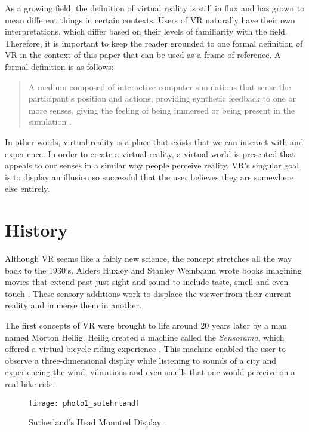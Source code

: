 As a growing field, the definition of virtual reality is still in flux and has grown to mean different things in certain contexts. Users of VR naturally have their own interpretations, which differ based on their levels of familiarity with the field.  Therefore, it is important to keep the reader grounded to one formal definition of VR in the context of this paper that can be used as a frame of reference. A formal definition is as follows:


\begin{quote}
	A medium composed of interactive computer simulations that sense the participant's position and actions, providing synthetic feedback to one or more senses, giving the feeling of being 
	immersed or being present in the simulation \cite{craig}.
\end{quote}

In other words, virtual reality is a place that exists that we can interact with and experience. In order to create a virtual reality, a virtual world is presented that appeals to our senses in a similar way people perceive reality. VR's singular goal is to display an illusion so successful that the user believes they are somewhere else entirely. 


\section{History}\label{History}


Although VR seems like a fairly new science, the concept stretches all the way back to the 1930's. Alders Huxley and Stanley Weinbaum wrote books imagining movies that extend past just sight and sound to include taste, smell and even touch \cite{mihelj_apps}. These sensory additions work to displace the viewer from their current reality and immerse them in another. 


\par The first concepts of VR were brought to life around 20 years later by a man named Morton Heilig. Heilig created a machine called the \textit {Sensorama}, which offered a virtual bicycle riding experience \cite{mihelj_apps}. This machine enabled the user to observe a three-dimensional display while listening to sounds of a city and experiencing the wind, vibrations and even smells that one would perceive on a real bike ride.

\begin{figure}[h]
	\centering
	\texttt{[image: photo1\_sutehrland]}
	\caption{Sutherland's Head Mounted Display \cite{photo1_Sutherland}.}
	\label{fig:sutherland_Display}
\end{figure} 


